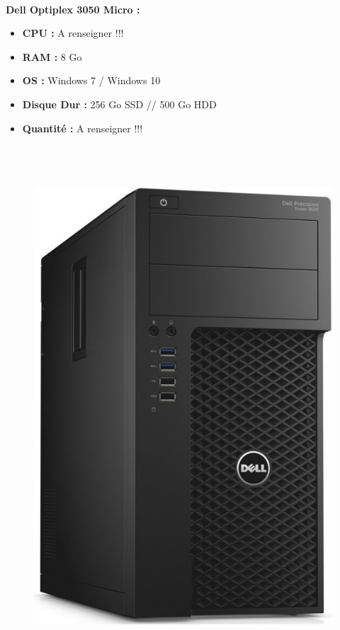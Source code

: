 \documentclass[11pt,a4paper,oneside]{article}
\begin{document}
\paragraph{}\textbf{Dell Optiplex 3050 Micro :} \\
\begin{itemize}
\item \textbf{CPU :} A renseigner !!!
\item \textbf{RAM :} 8 Go
\item \textbf{OS :} Windows 7 / Windows 10
\item \textbf{Disque Dur :} 256 Go SSD // 500 Go HDD
\item \textbf{Quantité :} A renseigner !!!
\\ \\ \\ \\
\end{itemize}
\begin{figure}
\includegraphics[scale=0.3]{Ressources/Materiel/3620.jpg}\vspace{-2cm}
\end{figure}
\end{document}
